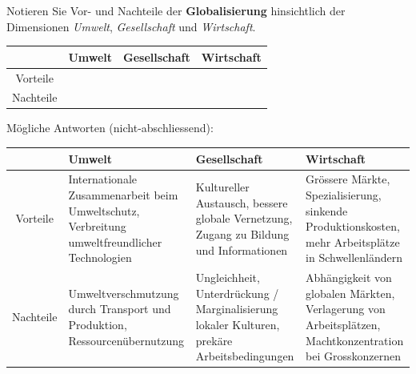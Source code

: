 \begin{myexercise}
    Notieren Sie Vor- und Nachteile der \textbf{Globalisierung} hinsichtlich der Dimensionen \textit{Umwelt}, \textit{Gesellschaft} und \textit{Wirtschaft}.
    \begin{table}[H]
        \centering
        \begin{tabular}{c|p{}|p{}|p{}}
                      & Umwelt & Gesellschaft & Wirtschaft \\\midrule\midrule
            Vorteile  &        &              &            \\[50pt]\midrule
            Nachteile &        &              &            \\[50pt]
        \end{tabular}
    \end{table}
    \begin{myanswer}
        Mögliche Antworten (nicht-abschliessend):
        \begin{table}[H]
            \centering
            \small
            \begin{tabular}{c|p{}|p{}|p{}}
                 & Umwelt                                                                                                   & Gesellschaft & Wirtschaft \\\midrule\midrule
                Vorteile
                 & Internationale Zusammenarbeit beim Umweltschutz, Verbreitung umweltfreundlicher Technologien
                 & Kultureller Austausch, bessere globale Vernetzung, Zugang zu Bildung und Informationen
                 & Grössere Märkte, Spezialisierung, sinkende Produktionskosten, mehr Arbeitsplätze in Schwellenländern                                 \\[50pt]\midrule
                Nachteile
                 & Umweltverschmutzung durch Transport und Produktion, Ressourcenübernutzung
                 & Ungleichheit, Unterdrückung / Marginalisierung lokaler Kulturen, prekäre Arbeitsbedingungen
                 & Abhängigkeit von globalen Märkten, Verlagerung von Arbeitsplätzen, Machtkonzentration bei Grosskonzernen                             \\[50pt]
            \end{tabular}
        \end{table}
    \end{myanswer}
\end{myexercise}

